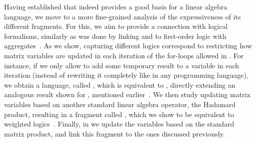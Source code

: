 Having established that \langfor indeed provides a good basis for a linear algebra language, we move to a more fine-grained analysis of the expressiveness of its different fragments. For this, we aim to provide a connection with logical formalisms, similarly as was done by linking \lara and \lang to first-order logic with aggregates~\cite{BarceloH0S20,matlang-journal}. As we show, capturing different logics correspond to restricting how matrix variables are updated in each iteration of the for-loops allowed in \langfor. For instance, if we only allow to add some temporary result to a variable in each iteration (instead of rewriting it completely like in any programming language), we obtain a language, called \langsum, which is equivalent to \rak, directly extending an analogous result shown for \lang, mentioned earlier~\cite{brijder2019matrices}. We then study updating matrix variables based on another standard linear algebra operator, the Hadamard product, resulting in a fragment called \langprod, which we show to be equivalent to weighted logics~\cite{DrosteG05}. Finally, in \langmprod 
we update the variables based on the standard matrix product, and link this fragment 
to the ones discussed previously.  

